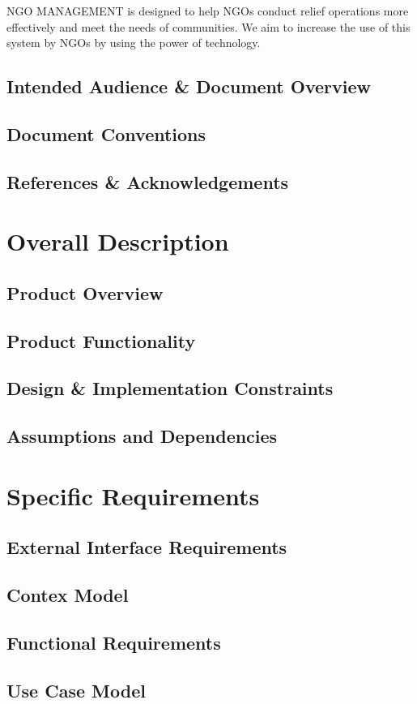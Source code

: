 \documentclass{report}
\begin{document}
			NGO MANAGEMENT is designed to help NGOs conduct relief operations more effectively and meet the needs of communities. We aim to 			increase the use of this system by NGOs by using the power of technology.
		\section{Intended Audience \& Document Overview}
		\section{Document Conventions}
		\section{References \& Acknowledgements}
	\chapter{Overall Description}
		\section{Product Overview}
		\section{Product Functionality}
		\section{Design \& Implementation Constraints}
		\section{Assumptions and Dependencies}
	\chapter{Specific Requirements}
		\section{External Interface Requirements}
		\section{Contex Model}
		\section{Functional Requirements}
		\section{Use Case Model}
\end{document}
